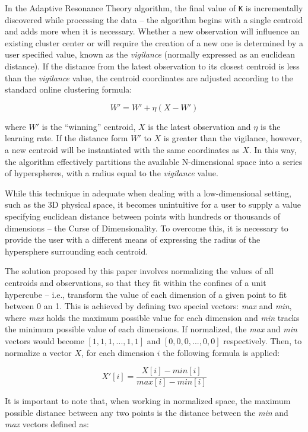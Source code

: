 \documentclass{l4proj}
\begin{document}
In the Adaptive Resonance Theory algorithm, the final value of \texttt{K} is incrementally discovered while processing the data -- the algorithm begins with a single centroid and adds more when it is necessary. Whether a new observation will influence an existing cluster center or will require the creation of a new one is determined by a user specified value, known as the \textit{vigilance} (normally expressed as an euclidean distance). If the distance from the latest observation to its closest centroid is less than the \textit{vigilance} value, the centroid coordinates are adjusted according to the standard online clustering formula:

$$W' = W' + \eta(X - W')$$

\noindent where $W'$ is the ``winning'' centroid, $X$ is the latest observation and $\eta$ is the learning rate. If the distance form $W'$ to $X$ is greater than the vigilance, however, a new centroid will be instantiated with the same coordinates as $X$. In this way, the algorithm effectively partitions the available N-dimensional space into a series of hyperspheres, with a radius equal to the \textit{vigilance} value.

While this technique in adequate when dealing with a low-dimensional setting, such as the 3D physical space, it becomes unintuitive for a user to supply a value specifying euclidean distance between points with hundreds or thousands of dimensions -- the Curse of Dimensionality\cite{CurseOfDimensionality}. To overcome this, it is necessary to provide the user with a different means of expressing the radius of the hypersphere surrounding each centroid.

The solution proposed by this paper involves normalizing the values of all centroids and observations, so that they fit within the confines of a unit hypercube -- i.e., transform the value of each dimension of a given point to fit between 0 an 1. This is achieved by defining two special vectors: \textit{max} and \textit{min}, where \textit{max} holds the maximum possible value for each dimension and \textit{min} tracks the minimum possible value of each dimensions. If normalized, the \textit{max} and \textit{min} vectors would become $[1, 1, 1, ..., 1, 1]$ and $[0, 0, 0, ..., 0, 0]$ respectively. Then, to normalize a vector $X$, for each dimension $i$ the following formula is applied:

$$X'[i] = \frac{X[i] - min[i]}{max[i] - min[i]}$$

It is important to note that, when working in normalized space, the maximum possible distance between any two points is the distance between the \textit{min} and \textit{max} vectors defined as:
\end{document}
